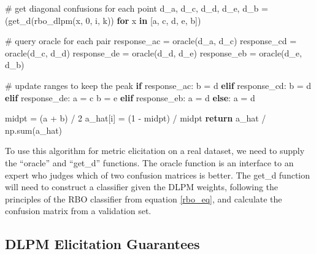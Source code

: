 \documentclass[
  letterpaper,
  numbers=noenddot,
  DIV=11,
  oneside]{scrreprt}
\newenvironment{Shaded}{\begin{snugshade}}{\end{snugshade}}
\newcommand{\BuiltInTok}[1]{\textcolor[rgb]{0.00,0.23,0.31}{#1}}
\newcommand{\CommentTok}[1]{\textcolor[rgb]{0.37,0.37,0.37}{#1}}
\newcommand{\ControlFlowTok}[1]{\textcolor[rgb]{0.00,0.23,0.31}{\textbf{#1}}}
\newcommand{\DecValTok}[1]{\textcolor[rgb]{0.68,0.00,0.00}{#1}}
\newcommand{\KeywordTok}[1]{\textcolor[rgb]{0.00,0.23,0.31}{\textbf{#1}}}
\newcommand{\NormalTok}[1]{\textcolor[rgb]{0.00,0.23,0.31}{#1}}
\newcommand{\OperatorTok}[1]{\textcolor[rgb]{0.37,0.37,0.37}{#1}}
\theoremstyle{remark}
\begin{document}
\begin{Shaded}
\begin{Highlighting}[numbers=left,,]
            \CommentTok{\# get diagonal confusions for each point}
\NormalTok{            d\_a, d\_c, d\_d, d\_e, d\_b }\OperatorTok{=}\NormalTok{ (get\_d(rbo\_dlpm(x, }\DecValTok{0}\NormalTok{, i, k)) }
                \ControlFlowTok{for}\NormalTok{ x }\KeywordTok{in}\NormalTok{ [a, c, d, e, b])}

            \CommentTok{\# query oracle for each pair}
\NormalTok{            response\_ac }\OperatorTok{=}\NormalTok{ oracle(d\_a, d\_c)}
\NormalTok{            response\_cd }\OperatorTok{=}\NormalTok{ oracle(d\_c, d\_d)}
\NormalTok{            response\_de }\OperatorTok{=}\NormalTok{ oracle(d\_d, d\_e)}
\NormalTok{            response\_eb }\OperatorTok{=}\NormalTok{ oracle(d\_e, d\_b)}

            \CommentTok{\# update ranges to keep the peak}
            \ControlFlowTok{if}\NormalTok{ response\_ac:}
\NormalTok{                b }\OperatorTok{=}\NormalTok{ d}
            \ControlFlowTok{elif}\NormalTok{ response\_cd:}
\NormalTok{                b }\OperatorTok{=}\NormalTok{ d}
            \ControlFlowTok{elif}\NormalTok{ response\_de:}
\NormalTok{                a }\OperatorTok{=}\NormalTok{ c}
\NormalTok{                b }\OperatorTok{=}\NormalTok{ e}
            \ControlFlowTok{elif}\NormalTok{ response\_eb:}
\NormalTok{                a }\OperatorTok{=}\NormalTok{ d}
            \ControlFlowTok{else}\NormalTok{:}
\NormalTok{                a }\OperatorTok{=}\NormalTok{ d}

\NormalTok{        midpt }\OperatorTok{=}\NormalTok{ (a }\OperatorTok{+}\NormalTok{ b) }\OperatorTok{/} \DecValTok{2}
\NormalTok{        a\_hat[i] }\OperatorTok{=}\NormalTok{ (}\DecValTok{1} \OperatorTok{{-}}\NormalTok{ midpt) }\OperatorTok{/}\NormalTok{ midpt}
    \ControlFlowTok{return}\NormalTok{ a\_hat }\OperatorTok{/}\NormalTok{ np.}\BuiltInTok{sum}\NormalTok{(a\_hat)}
\end{Highlighting}
\end{Shaded}

To use this algorithm for metric elicitation on a real dataset, we need
to supply the ``oracle'' and ``get\_d'' functions. The oracle function
is an interface to an expert who judges which of two confusion matrices
is better. The get\_d function will need to construct a classifier given
the DLPM weights, following the principles of the RBO classifier from
equation \hyperref[rbo_eq]{{[}rbo\_eq{]}}, and calculate the confusion
matrix from a validation set.

\subsection{DLPM Elicitation
Guarantees}\label{dlpm-elicitation-guarantees}
\end{document}
